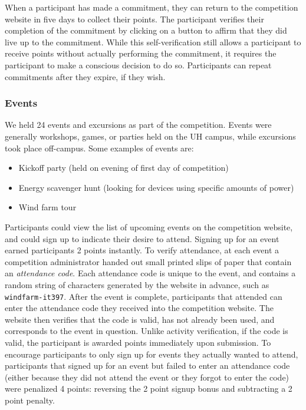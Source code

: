 When a participant has made a commitment, they can return to the competition website in five days to collect their points. The participant verifies their completion of the commitment by clicking on a button to affirm that they did live up to the commitment. While this self-verification still allows a participant to receive points without actually performing the commitment, it requires the participant to make a conscious decision to do so. Participants can repeat commitments after they expire, if they wish.


\subsubsection{Events}

We held 24 events and excursions as part of the competition. Events were generally workshops, games, or parties held on the UH \Manoa campus, while excursions took place off-campus. Some examples of events are:

\begin{itemize}
	\item Kickoff party (held on evening of first day of competition)
	\item Energy scavenger hunt (looking for devices using specific amounts of power)
	\item Wind farm tour
\end{itemize}

Participants could view the list of upcoming events on the competition website, and could sign up to indicate their desire to attend. Signing up for an event earned participants 2 points instantly. To verify attendance, at each event a competition administrator handed out small printed slips of paper that contain an \emph{attendance code}. Each attendance code is unique to the event, and contains a random string of characters generated by the website in advance, such as {\tt windfarm-it397}. After the event is complete, participants that attended can enter the attendance code they received into the competition website. The website then verifies that the code is valid, has not already been used, and corresponds to the event in question. Unlike activity verification, if the code is valid, the participant is awarded points immediately upon submission. To encourage participants to only sign up for events they actually wanted to attend, participants that signed up for an event but failed to enter an attendance code (either because they did not attend the event or they forgot to enter the code) were penalized 4 points: reversing the 2 point signup bonus and subtracting a 2 point penalty.


